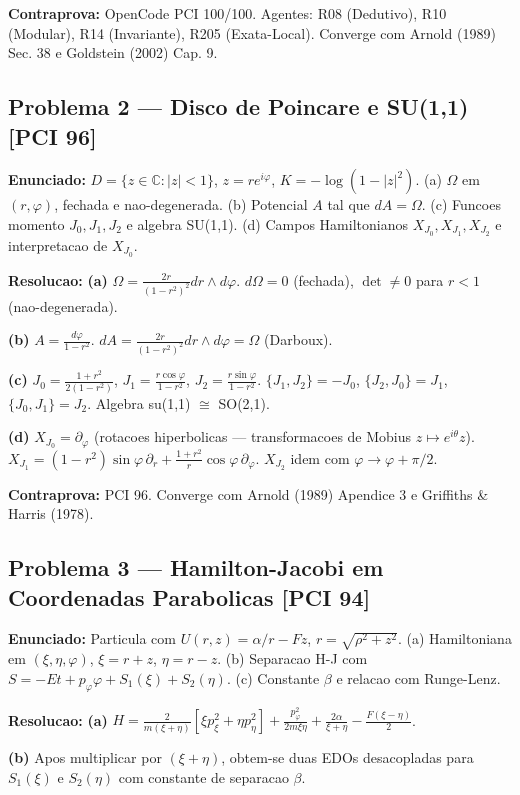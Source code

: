 \documentclass[12pt,a4paper,oneside]{article}
\begin{document}
\textbf{Contraprova:} OpenCode PCI 100/100. Agentes: R08 (Dedutivo), R10 (Modular), R14 (Invariante), R205 (Exata-Local). Converge com Arnold (1989) Sec. 38 e Goldstein (2002) Cap. 9.

\subsection{Problema 2 — Disco de Poincare e SU(1,1) [PCI 96]}
\textbf{Enunciado:} $D=\{z\in\mathbb{C}:|z|<1\}$, $z=re^{i\varphi}$, $K=-\log(1-|z|^2)$.
(a) $\Omega$ em $(r,\varphi)$, fechada e nao-degenerada.
(b) Potencial $A$ tal que $dA=\Omega$.
(c) Funcoes momento $J_0,J_1,J_2$ e algebra SU(1,1).
(d) Campos Hamiltonianos $X_{J_0},X_{J_1},X_{J_2}$ e interpretacao de $X_{J_0}$.

\textbf{Resolucao:}
\textbf{(a)} $\Omega=\frac{2r}{(1-r^2)^2}dr\wedge d\varphi$. $d\Omega=0$ (fechada), $\det\neq0$ para $r<1$ (nao-degenerada).

\textbf{(b)} $A=\frac{d\varphi}{1-r^2}$. $dA=\frac{2r}{(1-r^2)^2}dr\wedge d\varphi=\Omega$ (Darboux).

\textbf{(c)} $J_0=\frac{1+r^2}{2(1-r^2)}$, $J_1=\frac{r\cos\varphi}{1-r^2}$, $J_2=\frac{r\sin\varphi}{1-r^2}$.
$\{J_1,J_2\}=-J_0$, $\{J_2,J_0\}=J_1$, $\{J_0,J_1\}=J_2$. Algebra su(1,1) $\cong$ SO(2,1).

\textbf{(d)} $X_{J_0}=\partial_\varphi$ (rotacoes hiperbolicas — transformacoes de Mobius $z\mapsto e^{i\theta}z$).
$X_{J_1}=(1-r^2)\sin\varphi\,\partial_r+\frac{1+r^2}{r}\cos\varphi\,\partial_\varphi$. $X_{J_2}$ idem com $\varphi\to\varphi+\pi/2$.

\textbf{Contraprova:} PCI 96. Converge com Arnold (1989) Apendice 3 e Griffiths \& Harris (1978).

\subsection{Problema 3 — Hamilton-Jacobi em Coordenadas Parabolicas [PCI 94]}
\textbf{Enunciado:} Particula com $U(r,z)=\alpha/r-Fz$, $r=\sqrt{\rho^2+z^2}$.
(a) Hamiltoniana em $(\xi,\eta,\varphi)$, $\xi=r+z$, $\eta=r-z$.
(b) Separacao H-J com $S=-Et+p_\varphi\varphi+S_1(\xi)+S_2(\eta)$.
(c) Constante $\beta$ e relacao com Runge-Lenz.

\textbf{Resolucao:}
\textbf{(a)} $H=\frac{2}{m(\xi+\eta)}[\xi p_\xi^2+\eta p_\eta^2]+\frac{p_\varphi^2}{2m\xi\eta}+\frac{2\alpha}{\xi+\eta}-\frac{F(\xi-\eta)}{2}$.

\textbf{(b)} Apos multiplicar por $(\xi+\eta)$, obtem-se duas EDOs desacopladas para $S_1(\xi)$ e $S_2(\eta)$ com constante de separacao $\beta$.
\end{document}
